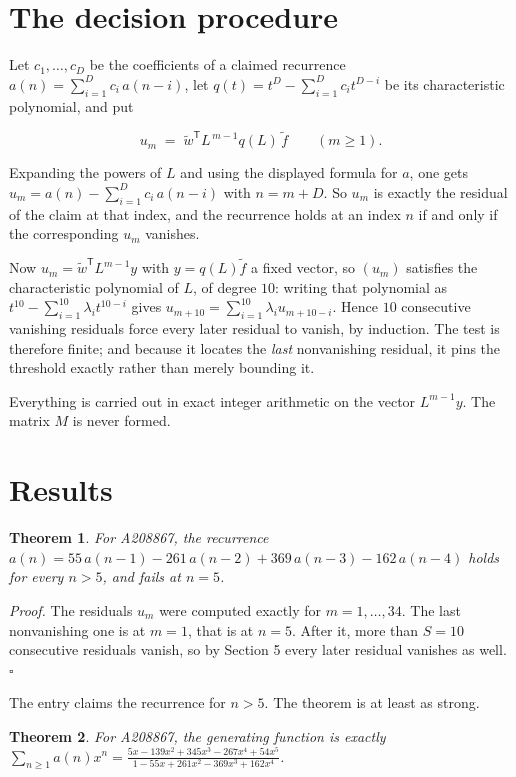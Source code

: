 \documentclass[11pt]{article}
\newtheorem{theorem}{Theorem}
\theoremstyle{definition}
\begin{document}
\section{The decision procedure}

Let $c_1,\dots,c_D$ be the coefficients of a claimed recurrence $a(n) = \sum_{i=1}^{D} c_i\,a(n-i)$, let $q(t) = t^{D} - \sum_{i=1}^{D} c_i t^{D-i}$ be its characteristic polynomial, and put

\[u_m \;=\; \tilde w^{\mathsf T} L^{\,m-1} q(L)\,\tilde f \qquad (m \ge 1).\]

Expanding the powers of $L$ and using the displayed formula for $a$, one gets $u_m = a(n) - \sum_{i=1}^{D} c_i\,a(n-i)$ with $n = m + D$. So $u_m$ is exactly the residual of the claim at that index, and the recurrence holds at an index $n$ if and only if the corresponding $u_m$ vanishes.

Now $u_m = \tilde w^{\mathsf T} L^{m-1} y$ with $y = q(L)\tilde f$ a fixed vector, so $(u_m)$ satisfies the characteristic polynomial of $L$, of degree $10$: writing that polynomial as $t^{10} - \sum_{i=1}^{10} \lambda_i t^{10-i}$ gives $u_{m+10} = \sum_{i=1}^{10} \lambda_i u_{m+10-i}$. Hence $10$ consecutive vanishing residuals force every later residual to vanish, by induction. The test is therefore finite; and because it locates the {\itshape last} nonvanishing residual, it pins the threshold exactly rather than merely bounding it.

Everything is carried out in exact integer arithmetic on the vector $L^{m-1}y$. The matrix $M$ is never formed.

\section{Results}

\begin{theorem} For A208867, the recurrence $a(n) = 55\,a(n-1) - 261\,a(n-2) + 369\,a(n-3) - 162\,a(n-4)$ holds for every $n > 5$, and fails at $n = 5$.\end{theorem}

{\itshape Proof.} The residuals $u_m$ were computed exactly for $m = 1,\dots,34$. The last nonvanishing one is at $m = 1$, that is at $n = 5$. After it, more than $S = 10$ consecutive residuals vanish, so by Section 5 every later residual vanishes as well. $\square$

The entry claims the recurrence for $n > 5$. The theorem is at least as strong.

\begin{theorem} For A208867, the generating function is exactly $\sum_{n\ge 1} a(n)x^n = \frac{5x - 139x^{2} + 345x^{3} - 267x^{4} + 54x^{5}}{1 - 55x + 261x^{2} - 369x^{3} + 162x^{4}}$.\end{theorem}
\end{document}
